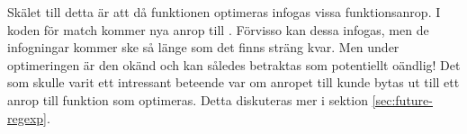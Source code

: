 \documentclass[Rapport]{subfiles}
\begin{document}
Skälet till detta är att då funktionen  optimeras infogas
vissa funktionsanrop. I koden för match kommer nya anrop till .
Förvisso kan dessa infogas, men de infogningar kommer ske så länge som det
finns sträng kvar. Men under optimeringen är den okänd och kan således betraktas
som potentiellt oändlig! Det som skulle varit ett intressant beteende var
om anropet till  kunde bytas ut till ett anrop till funktion
som optimeras. Detta diskuteras mer i sektion
\ref{sec:future-regexp}.

\end{document}
